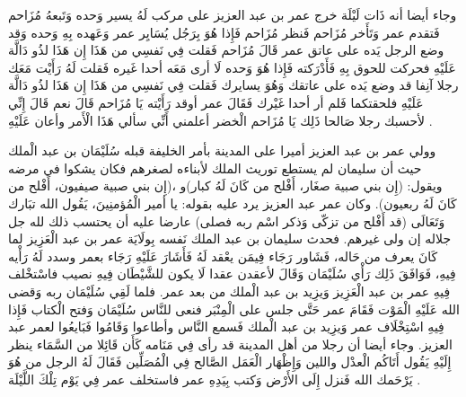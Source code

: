 وجاء أيضا أنه ذَات لَيْلَة خرج عمر بن عبد العزيز على مركب لَهُ يسير وَحده وَتَبعهُ مُزَاحم فَتقدم عمر وَتَأَخر مُزَاحم فَنظر مُزَاحم فَإِذا هُوَ بِرَجُل يُسَايِر عمر وَعَهده بِهِ وَحده وَقد وضع الرجل يَده على عاتق عمر قَالَ مُزَاحم فَقلت فِي نَفسِي من هَذَا إِن هَذَا لذُو دَالَّة عَلَيْهِ فحركت للحوق بِهِ فَأَدْرَكته فَإِذا هُوَ وَحده لَا أرى مَعَه أحدا غَيره فَقلت لَهُ رَأَيْت مَعَك رجلا آنِفا قد وضع يَده على عاتقك وَهُوَ يسايرك فَقلت فِي نَفسِي من هَذَا إِن هَذَا لذُو دَالَّة عَلَيْهِ فلحقتكما فَلم أر أحدا غَيْرك فَقَالَ عمر أوقد رَأَيْته يَا مُزَاحم قَالَ نعم قَالَ إِنِّي لأحسبك رجلا صَالحا ذَلِك يَا مُزَاحم الْخضر أعلمني أَنِّي سألي هَذَا الْأَمر وأعان عَلَيْهِ \cite{ibnAbdAlHakam_OmarIbnAbdAlAziz}. 

وولي عمر بن عبد العزيز أميرا على المدينة بأمر الخليفة قبله سُلَيْمَان بن عبد الْملك حيث أن سليمان لم يستطع توريث الملك لأبناءه لصغرهم فكان يشكوا في مرضه ويقول: (إِن بني صبية صغَار، أَفْلح من كَانَ لَهُ كبار)و ،(إِن بني صبية صيفيون، أَفْلح من كَانَ لَهُ ربعيون). وكان عمر عبد العزيز يرد عليه بقوله: يا أمير الْمُؤمنِينَ، يَقُول الله تبَارك وَتَعَالَى (قد أَفْلح من تزكّى وَذكر اسْم ربه فصلى) عارضا عليه أن يحتسب ذلك لله جل جلاله إن ولى غيرهم. فحدث سليمان بن عبد الملك نَفسه بِولَايَة عمر بن عبد الْعَزِيز لما كَانَ يعرف من حَاله، فَشَاور رَجَاء فِيمَن يعْقد لَهُ فَأَشَارَ عَلَيْهِ رَجَاء بعمر وسدد لَهُ رَأْيه فِيهِ، فَوَافَقَ ذَلِك رَأْي سُلَيْمَان وَقَالَ لأعقدن عقدا لَا يكون للشَّيْطَان فِيهِ نصيب فاسْتخْلف فِيهِ عمر بن عبد الْعَزِيز وَيزِيد بن عبد الْملك من بعد عمر. فلما لَقِي سُلَيْمَان ربه وَقضى الله عَلَيْهِ الْمَوْت فَقَامَ عمر حَتَّى جلس على الْمِنْبَر فنعى للنَّاس سُلَيْمَان وَفتح الْكتاب فَإِذا فِيهِ اسْتِخْلَاف عمر وَيزِيد بن عبد الْملك فَسمع النَّاس وأطاعوا وَقَامُوا فَبَايعُوا لعمر عبد العزيز. وجاء أيضا أن رجلا من أهل المدينة قد رأى فِي مَنَامه كَأَن قَائِلا من السَّمَاء ينظر إِلَيْهِ يَقُول أَتَاكُم الْعدْل واللين وَإِظْهَار الْعَمَل الصَّالح فِي الْمُصَلِّين فَقَالَ لَهُ الرجل من هُوَ يَرْحَمك الله فَنزل إِلَى الأَرْض وَكتب بِيَدِهِ عمر فاستخلف عمر فِي يَوْم تِلْكَ اللَّيْلَة \cite{ibnAbdAlHakam_OmarIbnAbdAlAziz}.

